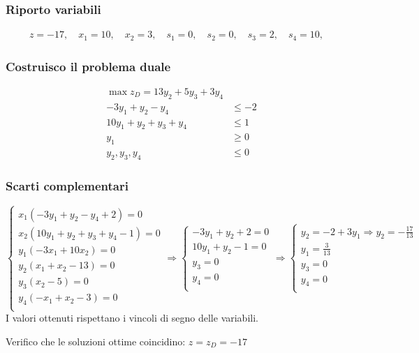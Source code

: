 \documentclass[\main/main.tex]{subfiles}
\begin{document}
\subsubsection*{Riporto variabili}

\begin{align*}
  z   = -17, \quad
  x_1 = 10 , \quad
  x_2 = 3  , \quad
  s_1 = 0  , \quad
  s_2 = 0  , \quad
  s_3 = 2  , \quad
  s_4 = 10 , \quad
\end{align*}

\subsubsection*{Costruisco il problema duale}
\begin{align*}
  \max z_D = 13y_2 + 5y_3 + 3y_4   \\
  -3y_1 +y_2 -y_4        & \leq -2 \\
  10y_1 + y_2 + y_3 +y_4 & \leq 1  \\
  y_1                    & \geq 0  \\
  y_2, y_3, y_4          & \leq 0
\end{align*}
\subsubsection*{Scarti complementari}
\[
  \begin{cases}
    x_1(-3y_1 +y_2 -y_4   + 2) = 0      \\
    x_2(10y_1 + y_2 + y_3 +y_4 - 1) = 0 \\
    y_1(-3x_1 + 10x_2)= 0               \\
    y_2(x_1 + x_2     - 13)= 0          \\
    y_3(x_2           - 5 )= 0          \\
    y_4(-x_1 + x_2    - 3 )= 0          \\
  \end{cases}
  \Rightarrow
  \begin{cases}
    -3y_1 +y_2   + 2 = 0 \\
    10y_1 + y_2  - 1 = 0 \\
    y_3= 0               \\
    y_4= 0               \\
  \end{cases}
  \Rightarrow
  \begin{cases}
    y_2 = -2 + 3y_1 \Rightarrow y_2 = -\frac{17}{13} \\
    y_1 = \frac{3}{13}                               \\
    y_3= 0                                           \\
    y_4= 0                                           \\
  \end{cases}
\]
I valori ottenuti rispettano i vincoli di segno delle variabili.

Verifico che le soluzioni ottime coincidino: $z = z_D = -17$
\end{document}
